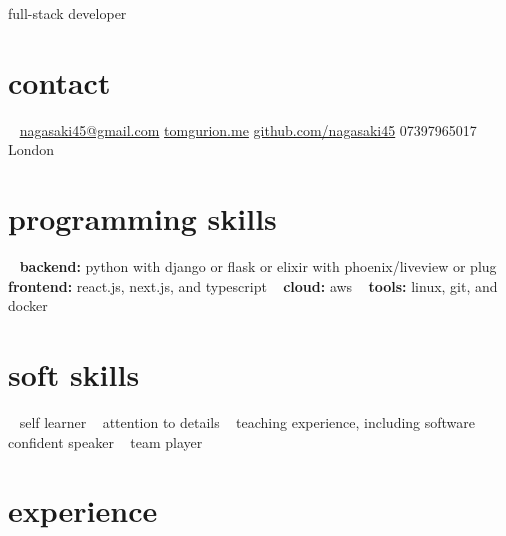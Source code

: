 \documentclass[]{friggeri-cv}
\begin{document}
       {full-stack developer}



\begin{aside}
\section{contact}
~
\href{mailto:nagasaki45@gmail.com}{nagasaki45@gmail.com}
\href{http://tomgurion.me}{tomgurion.me}
\href{https://github.com/nagasaki45}{github.com/nagasaki45}
07397965017
London
~
\section{programming skills}
~
\textbf{backend:} python with django or flask or elixir with phoenix/liveview or plug
~
\textbf{frontend:} react.js, next.js, and typescript
~
\textbf{cloud:} aws
~
\textbf{tools:} linux, git, and docker
~
\section{soft skills}
~
self learner
~
attention to details
~
teaching experience, including software
~
confident speaker
~
team player
\end{aside}



\section{experience}
\end{document}
